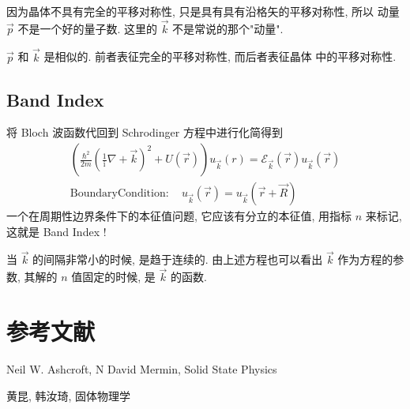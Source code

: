\documentclass{ctexart}
\begin{document}
因为晶体不具有完全的平移对称性, 只是具有具有沿格矢的平移对称性, 所以
动量 $\vec{p}$ 不是一个好的量子数. 这里的 $\vec{k}$ 不是常说的那个"动量".

$\vec{p}$ 和 $\vec{k}$ 是相似的. 前者表征完全的平移对称性, 而后者表征晶体
中的平移对称性.

\subsection{Band Index}

将 Bloch 波函数代回到 Schrodinger 方程中进行化简得到
\begin{align*}
  \left( \frac{\hbar^2}{2m}\left( \frac{1}{\mathrm{i}}\nabla +\vec{k} \right)^2
  + U(\vec{r})\right)u_{\vec{k}}(r) = \mathcal{E}_{\vec{k}}(\vec{r}) u_{\vec{k}}(\vec{r})\\
  \mathrm{Boundary Condition:} \quad u_{\vec{k}}(\vec{r}) = u_{\vec{k}}(\vec{r}+\vec{R})
\end{align*}
一个在周期性边界条件下的本征值问题, 它应该有分立的本征值, 用指标 $n$ 来标记,
这就是 Band Index !

当 $\vec{k}$ 的间隔非常小的时候, 是趋于连续的. 由上述方程也可以看出 $\vec{k}$
作为方程的参数, 其解的 $n$ 值固定的时候, 是 $\vec{k}$ 的函数.


\section{参考文献}

Neil W. Ashcroft, N David Mermin, Solid State Physics

黄昆, 韩汝琦, 固体物理学
\end{document}

